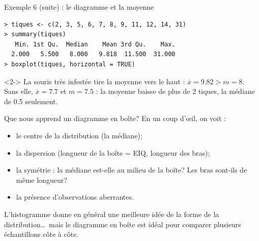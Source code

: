 \documentclass{BeamerTemplate}
\begin{document}
\begin{frame}[fragile,t]{Exemple 6 (suite) : le diagramme et la moyenne}
  \begin{center}
  \end{center}
\begin{Verbatim}[fontsize=\scriptsize, formatcom=\color{TexteBoite}]
> tiques <- c(2, 3, 5, 6, 7, 8, 9, 11, 12, 14, 31)
> summary(tiques)
   Min. 1st Qu.  Median    Mean 3rd Qu.    Max.
  2.000   5.500   8.000   9.818  11.500  31.000
> boxplot(tiques, horizontal = TRUE)
\end{Verbatim}
  \begin{uncoverenv}<2->
  \small
  La souris très infestée tire la moyenne vers le haut : $\overline{x} = 9.82
  > m = 8$. Sans elle, $\overline{x} = 7.7$ et $m = 7.5$ : la moyenne baisse de
  plus de 2 tiques, la médiane de 0.5 seulement.
  \end{uncoverenv}
\end{frame}

\begin{frame}[t]{Que nous apprend un diagramme en boîte?}
  En un coup d'\oe il, on voit :
  \begin{itemize}\itemsep 2mm
    \item le \alert{centre} de la distribution (la médiane);
    \item la \alert{dispersion} (longueur de la boîte = EIQ, longueur des bras);
    \item la \alert{symétrie} : la médiane est-elle au milieu de la boîte? Les
      bras sont-ils de même longueur?
    \item la présence d'observations \alert{aberrantes}.
  \end{itemize}

  \medskip
  L'histogramme donne en général une meilleure idée de la forme de la
  distribution\ldots\ mais le diagramme en boîte est \alert{idéal pour comparer
  plusieurs échantillons} côte à côte.
\end{frame}
\end{document}

